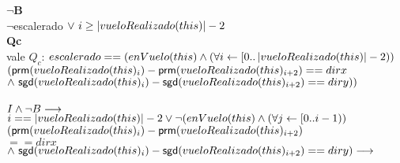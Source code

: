 \documentclass[a4paper]{article}
\begin{document}
        \textbf{$\neg$B}\\
        $\neg$escalerado$ \ \vee \ i \geq \left| vueloRealizado(this) \right| - 2$
        \\
        \textbf{Qc}\\
		vale $Q_c$: $ escalerado == (enVuelo(this) \land (\forall i \leftarrow [0..\left| vueloRealizado(this) \right| - 2)) $ $ (\mathsf{prm}(vueloRealizado(this)_i) - \mathsf{prm}(vueloRealizado(this)_{i+2}) == dirx $ $ \land \ \mathsf{sgd}(vueloRealizado(this)_i) - \mathsf{sgd}(vueloRealizado(this)_{i+2}) == diry)) $ \\
\\ $I \land \neg B \longrightarrow $\\
$i == \left| vueloRealizado(this) \right| -2 \vee \neg (enVuelo(this) \land (\forall j \leftarrow [0..i -1)) $\\ $ (\mathsf{prm}(vueloRealizado(this)_i) - \mathsf{prm}(vueloRealizado(this)_{i+2})$\\$ == dirx $ $ \land \ \mathsf{sgd}(vueloRealizado(this)_i) - \mathsf{sgd}(vueloRealizado(this)_{i+2}) == diry) \longrightarrow $\\
$ $
		     
\end{document}
